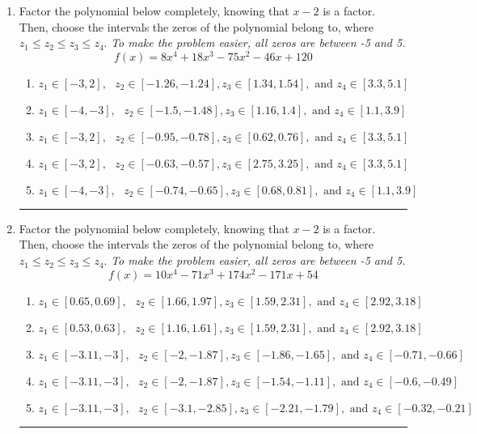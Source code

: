 \documentclass[14pt]{extbook}
\newcommand{\litem}[1]{\item#1\hspace*{-1cm}\rule{\textwidth}{0.4pt}}
\begin{document}
\begin{enumerate}
{\begin{enumerate}[label=\Alph*.]
\end{enumerate} }
\litem{
Factor the polynomial below completely, knowing that $x-2$ is a factor. Then, choose the intervals the zeros of the polynomial belong to, where $z_1 \leq z_2 \leq z_3 \leq z_4$. \textit{To make the problem easier, all zeros are between -5 and 5.}\[ f(x) = 8x^{4} +18 x^{3} -75 x^{2} -46 x + 120 \]\begin{enumerate}[label=\Alph*.]
\item \( z_1 \in [-3, 2], \text{   }  z_2 \in [-1.26, -1.24], z_3 \in [1.34, 1.54], \text{   and   } z_4 \in [3.3, 5.1] \)
\item \( z_1 \in [-4, -3], \text{   }  z_2 \in [-1.5, -1.48], z_3 \in [1.16, 1.4], \text{   and   } z_4 \in [1.1, 3.9] \)
\item \( z_1 \in [-3, 2], \text{   }  z_2 \in [-0.95, -0.78], z_3 \in [0.62, 0.76], \text{   and   } z_4 \in [3.3, 5.1] \)
\item \( z_1 \in [-3, 2], \text{   }  z_2 \in [-0.63, -0.57], z_3 \in [2.75, 3.25], \text{   and   } z_4 \in [3.3, 5.1] \)
\item \( z_1 \in [-4, -3], \text{   }  z_2 \in [-0.74, -0.65], z_3 \in [0.68, 0.81], \text{   and   } z_4 \in [1.1, 3.9] \)

\end{enumerate} }
\litem{
Factor the polynomial below completely, knowing that $x-2$ is a factor. Then, choose the intervals the zeros of the polynomial belong to, where $z_1 \leq z_2 \leq z_3 \leq z_4$. \textit{To make the problem easier, all zeros are between -5 and 5.}\[ f(x) = 10x^{4} -71 x^{3} +174 x^{2} -171 x + 54 \]\begin{enumerate}[label=\Alph*.]
\item \( z_1 \in [0.65, 0.69], \text{   }  z_2 \in [1.66, 1.97], z_3 \in [1.59, 2.31], \text{   and   } z_4 \in [2.92, 3.18] \)
\item \( z_1 \in [0.53, 0.63], \text{   }  z_2 \in [1.16, 1.61], z_3 \in [1.59, 2.31], \text{   and   } z_4 \in [2.92, 3.18] \)
\item \( z_1 \in [-3.11, -3], \text{   }  z_2 \in [-2, -1.87], z_3 \in [-1.86, -1.65], \text{   and   } z_4 \in [-0.71, -0.66] \)
\item \( z_1 \in [-3.11, -3], \text{   }  z_2 \in [-2, -1.87], z_3 \in [-1.54, -1.11], \text{   and   } z_4 \in [-0.6, -0.49] \)
\item \( z_1 \in [-3.11, -3], \text{   }  z_2 \in [-3.1, -2.85], z_3 \in [-2.21, -1.79], \text{   and   } z_4 \in [-0.32, -0.21] \)

\end{enumerate} }
\end{enumerate}
\end{document}
